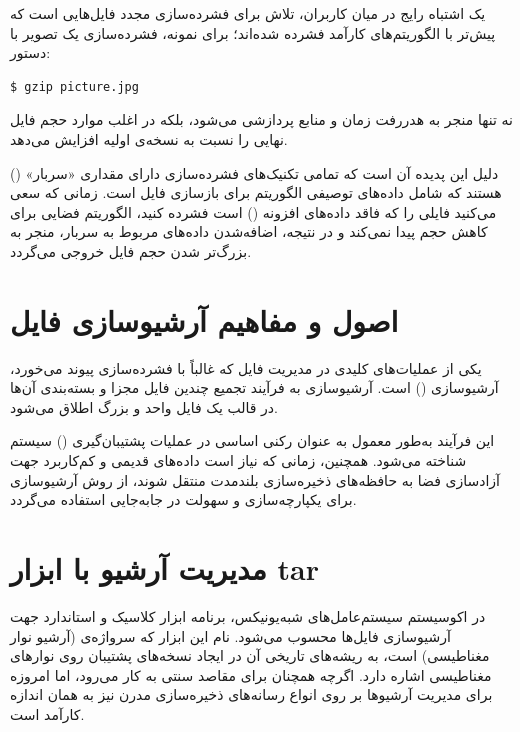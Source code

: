 یک اشتباه رایج در میان کاربران، تلاش برای فشرده‌سازی مجدد فایل‌هایی است که پیش‌تر با الگوریتم‌های کارآمد فشرده شده‌اند؛ برای نمونه، فشرده‌سازی یک تصویر  با دستور:

\begin{latin}
\begin{lstlisting}
$ gzip picture.jpg
\end{lstlisting}
\end{latin}

نه تنها منجر به هدررفت زمان و منابع پردازشی می‌شود، بلکه در اغلب موارد حجم فایل نهایی را نسبت به نسخه‌ی اولیه افزایش می‌دهد.

دلیل این پدیده آن است که تمامی تکنیک‌های فشرده‌سازی دارای مقداری «سربار» () هستند که شامل داده‌های توصیفی الگوریتم برای بازسازی فایل است. زمانی که سعی می‌کنید فایلی را که فاقد داده‌های افزونه () است فشرده کنید، الگوریتم فضایی برای کاهش حجم پیدا نمی‌کند و در نتیجه، اضافه‌شدن داده‌های مربوط به سربار، منجر به بزرگ‌تر شدن حجم فایل خروجی می‌گردد.

\section{اصول و مفاهیم آرشیو‌سازی فایل}

یکی از عملیات‌های کلیدی در مدیریت فایل که غالباً با فشرده‌سازی پیوند می‌خورد، آرشیو‌سازی () است. آرشیو‌سازی به فرآیند تجمیع چندین فایل مجزا و بسته‌بندی آن‌ها در قالب یک فایل واحد و بزرگ اطلاق می‌شود.

این فرآیند به‌طور معمول به عنوان رکنی اساسی در عملیات پشتیبان‌گیری () سیستم شناخته می‌شود. همچنین، زمانی که نیاز است داده‌های قدیمی و کم‌کاربرد جهت آزادسازی فضا به حافظه‌های ذخیره‌سازی بلندمدت منتقل شوند، از روش آرشیو‌سازی برای یکپارچه‌سازی و سهولت در جابه‌جایی استفاده می‌گردد.

\section{مدیریت آرشیو با ابزار tar}

در اکوسیستم سیستم‌عامل‌های شبه‌یونیکس، برنامه  ابزار کلاسیک و استاندارد جهت آرشیو‌سازی فایل‌ها محسوب می‌شود. نام این ابزار که سرواژه‌ی  (آرشیو نوار مغناطیسی) است، به ریشه‌های تاریخی آن در ایجاد نسخه‌های پشتیبان روی نوارهای مغناطیسی اشاره دارد. اگرچه  همچنان برای مقاصد سنتی به کار می‌رود، اما امروزه برای مدیریت آرشیوها بر روی انواع رسانه‌های ذخیره‌سازی مدرن نیز به همان اندازه کارآمد است.

